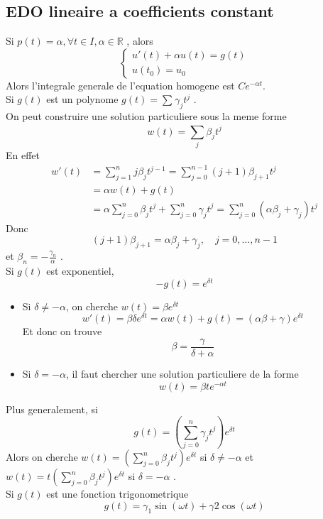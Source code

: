 \documentclass[../main.tex]{subfiles}
\begin{document}
\subsection{EDO lineaire a coefficients constant}
Si $p( t) = \alpha, \forall t \in I, \alpha \in \mathbb{R}$ , alors
\[ 
	\begin{cases}
	u'( t) + \alpha u( t) = g( t) \\
	u( t_0) = u_0
	\end{cases}
\]
Alors l'integrale generale de l'equation homogene est $C e^{- \alpha t} $.\\
Si $g( t) $ est un polynome $g( t) = \sum_{}^{ } \gamma_j t^{j}$ .\\
On peut construire une solution particuliere sous la meme forme
\[ 
	w( t) = \sum_{j}^{ } \beta_j t^{j}
\]
En effet
\begin{align*}
	w'( t) &= \sum_{j=1}^{ n} j \beta_j t^{j-1} = \sum_{j=0}^{ n-1} ( j+1)  \beta_{j+1} t^{j}\\
	       &= \alpha w( t)  + g( t) \\
	       &= \alpha \sum_{j=0}^{ n} \beta_j t^{j} + \sum_{j=0}^{ n}\gamma_j t^{j}= \sum_{j=0}^{ n} ( \alpha \beta_j + \gamma_j ) t^{j}
\end{align*}
Donc
\[ 
	( j+1)  \beta_{j+1}  = \alpha \beta_j + \gamma_j, \quad j = 0 , \ldots, n-1
\]
et $ \beta_n = - \frac{\gamma_n }{\alpha}$ .\\
Si $g( t) $ est exponentiel,
\[ 
	- g( t) = e^{\delta t} 
\]
\begin{itemize}
	\item Si $\delta \neq - \alpha$, on cherche $w( t) = \beta e^{\delta t} $ 
		\[ 
			w'( t) = \beta \delta e^{\delta t} = \alpha w( t)  + g( t) =(  \alpha \beta + \gamma ) e^{\delta t} 
		\]
		Et donc on trouve
		\[ 
		\beta = \frac{\gamma }{\delta + \alpha}
		\]

	\item Si $\delta = -\alpha$, il faut chercher une solution particuliere de la forme 
		\[ 
			w( t) = \beta t e^{- \alpha t} 
		\]
		
		
\end{itemize}
Plus generalement, si 
\[ 
	g( t) = \left( \sum_{j=0}^{ n}\gamma_j t^{j} \right) e^{\delta t} 
\]
Alors on cherche $w( t) = \left( \sum_{j=0}^{ n}\beta_j t^{j}\right) e^{\delta t} $ si $ \delta \neq - \alpha$ et
$w( t) = t\left( \sum_{j=0}^{ n}\beta_j t^{j}\right) e^{\delta t} $  si $\delta = - \alpha$ .\\
Si $g( t) $ est une fonction trigonometrique
\[ 
	g( t) = \gamma_1 \sin ( \omega t) + \gamma 2 \cos ( \omega t) 
\]
\end{document}
